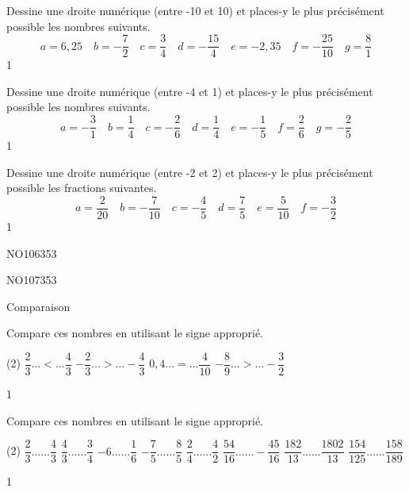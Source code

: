 \documentclass[a4paper,11pt]{report}
\begin{document}
\begin{exo}{
Dessine une droite numérique (entre -10 et 10) et places-y le plus précisément possible les nombres suivants.
\[
a=6,25 \quad b=-\dfrac{7}{2} \quad c=\dfrac{3}{4} \quad d=-\dfrac{15}{4} \quad e=-2,35 \quad f=-\dfrac{25}{10} \quad g=\dfrac{8}{1} 
\]}
{1}\end{exo}

\begin{exo}{
Dessine une droite numérique (entre -4 et 1) et places-y le plus précisément possible les nombres suivants.
\[
a=-\dfrac{3}{1} \quad b=\dfrac{1}{4} \quad c=-\dfrac{2}{6} \quad d=\dfrac{1}{4} \quad e=-\dfrac{1}{5} \quad f=\dfrac{2}{6} \quad
g=-\dfrac{2}{5}
\]}
{1}\end{exo}

\begin{exo}{
Dessine une droite numérique (entre -2 et 2) et places-y le plus précisément possible les fractions suivantes.
\[
a=\dfrac{2}{20} \quad b=-\dfrac{7}{10} \quad c=-\dfrac{4}{5} \quad d=\dfrac{7}{5} \quad e=\dfrac{5}{10} \quad f=-\dfrac{3}{2}
\]}
{1}\end{exo}

\begin{exof}{NO106}{35}{3}
\end{exof}
\begin{exof}{NO107}{35}{3}
\end{exof}


\begin{resolu}{Comparaison}{ Compare ces nombres en utilisant le signe approprié. 
\begin{tasks}(2)
	\task
	$\dfrac{2}{3} \ldots < \ldots \dfrac{4}{3}$ 
    \task 
  $-\dfrac{2}{3} \ldots > \ldots -\dfrac{4}{3}$
\task $0,4 \ldots=\ldots \dfrac{4}{10}$
\task  $-\dfrac{8}{9}\ldots>\ldots-\dfrac{3}{2}$ 
\end{tasks}
}{1}
\end{resolu}


\begin{exop}{
Compare ces nombres en utilisant le signe approprié. 
\begin{tasks}(2)
	\task $\dfrac{2}{3}\ldots \ldots \dfrac{4}{3} $
	\task $\dfrac{4}{3}\ldots \ldots \dfrac{3}{4} $
    \task $-6\ldots \ldots \dfrac{1}{6} $
	\task $-\dfrac{7}{5}\ldots \ldots \dfrac{8}{5} $
	\task $\dfrac{2}{4}\ldots \ldots \dfrac{4}{2} $
    \task $\dfrac{54}{16}\ldots \ldots -\dfrac{45}{16} $
	\task $\dfrac{182}{13}\ldots \ldots \dfrac{1802}{13} $
 \task $\dfrac{154}{125}\ldots \ldots \dfrac{158}{189} $
\end{tasks}
}{1}
\end{exop}
\end{document}
